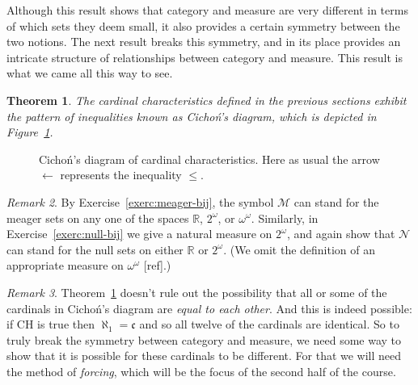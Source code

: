 \documentclass[11pt,oneside]{amsbook}
\newcommand{\RR}{\mathbb R}
\newcommand{\Null}{\mathcal N}
\newcommand{\Meager}{\mathcal M}
\DeclareMathOperator{\add}{\mathsf{add}}
\DeclareMathOperator{\non}{\mathsf{non}}
\DeclareMathOperator{\cov}{\mathsf{cov}}
\DeclareMathOperator{\cof}{\mathsf{cof}}
\theoremstyle{definition}
\theoremstyle{plain}
\newtheorem{thm}{Theorem}[section]
\theoremstyle{definition}
\theoremstyle{remark}
\newtheorem{rem}[thm]{Remark}
\begin{document}
Although this result shows that category and measure are very different in terms of which sets they deem small, it also provides a certain symmetry between the two notions. The next result breaks this symmetry, and in its place provides an intricate structure of relationships between category and measure. This result is what we came all this way to see.

\begin{thm}
  \label{thm:cichon}
  The cardinal characteristics defined in the previous sections exhibit the pattern of inequalities known as \emph{Cicho\'n's diagram}, which is depicted in Figure~\ref{fig:cichon}.
\end{thm}

\begin{figure}[h]
  \caption{Cicho\'n's diagram of cardinal characteristics. Here as usual the arrow $\leftarrow$ represents the inequality $\leq$.\label{fig:cichon}}
\end{figure}

\begin{rem}
  By Exercise~\ref{exerc:meager-bij}, the symbol $\Meager$ can stand for the meager sets on any one of the spaces $\RR$, $2^\omega$, or $\omega^\omega$. Similarly, in Exercise~\ref{exerc:null-bij} we give a natural measure on $2^\omega$, and again show that $\Null$ can stand for the null sets on either $\RR$ or $2^\omega$. (We omit the definition of an appropriate measure on $\omega^\omega$ [ref].) %
\end{rem}

\begin{rem}
  Theorem~\ref{thm:cichon} doesn't rule out the possibility that all or some of the cardinals in Cicho\'n's diagram are \emph{equal to each other}. And this is indeed possible: if CH is true then $\aleph_1=\mathfrak c$ and so all twelve of the cardinals are identical. So to truly break the symmetry between category and measure, we need some way to show that it is possible for these cardinals to be different. For that we will need the method of \emph{forcing}, which will be the focus of the second half of the course.
\end{rem}
\end{document}
